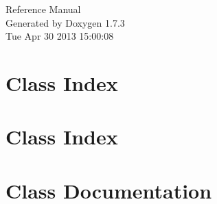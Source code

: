 \documentclass[a4paper]{book}
\begin{document}
\hypersetup{pageanchor=false}
\begin{titlepage}
\vspace*{7cm}
\begin{center}
{\Large Reference Manual}\\
\vspace*{1cm}
{\large Generated by Doxygen 1.7.3}\\
\vspace*{0.5cm}
{\small Tue Apr 30 2013 15:00:08}\\
\end{center}
\end{titlepage}
\clearemptydoublepage
{}
\tableofcontents
\clearemptydoublepage
{}
\hypersetup{pageanchor=true}
\chapter{Class Index}

\chapter{Class Index}

\chapter{Class Documentation}

























\printindex
\end{document}

